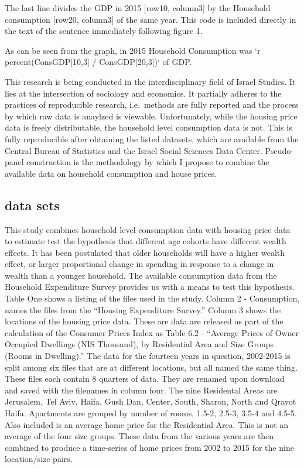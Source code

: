 \documentclass[12pt,a4paper,]{article}
\newenvironment{Shaded}{\begin{snugshade}}{\end{snugshade}}
\newcommand{\DataTypeTok}[1]{\textcolor[rgb]{0.13,0.29,0.53}{{#1}}}
\newcommand{\DecValTok}[1]{\textcolor[rgb]{0.00,0.00,0.81}{{#1}}}
\newcommand{\StringTok}[1]{\textcolor[rgb]{0.31,0.60,0.02}{{#1}}}
\newcommand{\NormalTok}[1]{{#1}}
\begin{document}
The last line divides the GDP in 2015 {[}row10, column3{]} by the
Household consumption {[}row20, column3{]} of the same year. This code
is included directly in the text of the sentence immediately following
figure 1.

\begin{Shaded}
\begin{Highlighting}[]
\NormalTok{As can be seen from the graph, in }\DecValTok{2015} \NormalTok{Household Consumption }
\NormalTok{was }\StringTok{`}\DataTypeTok{r percent(ConsGDP[10,3] / ConsGDP[20,3])}\StringTok{`} \NormalTok{of GDP.}
\end{Highlighting}
\end{Shaded}

This research is being conducted in the interdisciplinary field of
Israel Studies. It lies at the intersection of sociology and economics.
It partially adheres to the practices of reproducible research,
i.e.~methods are fully reported and the process by which raw data is
anaylzed is viewable. Unfortunately, while the housing price data is
freely distributable, the household level consumption data is not. This
is fully reproducible after obtaining the listed datasets, which are
available from the Central Bureau of Statistics and the Israel Social
Sciences Data Center. Pseudo-panel construction is the methodology by
which I propose to combine the available data on household consumption
and house prices.

\subsection{data sets}\label{data-sets}

This study combines household level consumption data with housing price
data to estimate test the hypothesis that different age cohorts have
different wealth effects. It has been postulated that older households
will have a higher wealth effect, or larger proportional change in
spending in response to a change in wealth than a younger household. The
available consumption data from the Household Expenditure Survey
provides us with a means to test this hypothesis. Table One shows a
listing of the files used in the study. Column 2 - Consumption, names
the files from the ``Housing Expenditure Survey.'' Column 3 shows the
locations of the housing price data. These are data are released as part
of the calculation of the Consumer Prices Index as Table 6.2 - ``Average
Prices of Owner Occupied Dwellings (NIS Thousand), by Residential Area
and Size Groups (Rooms in Dwelling).'' The data for the fourteen years
in question, 2002-2015 is split among six files that are at different
locations, but all named the same thing. These files each contain 8
quarters of data. They are renamed upon download and saved with the
filenames in column four. The nine Residental Areas are Jerusalem, Tel
Aviv, Haifa, Gush Dan, Center, South, Sharon, North and Qrayot Haifa.
Apartments are grouped by number of rooms, 1.5-2, 2.5-3, 3.5-4 and
4.5-5. Also included is an average home price for the Residential Area.
This is not an average of the four size groups. These data from the
various years are then combined to produce a time-series of home prices
from 2002 to 2015 for the nine location/size pairs.
\end{document}
